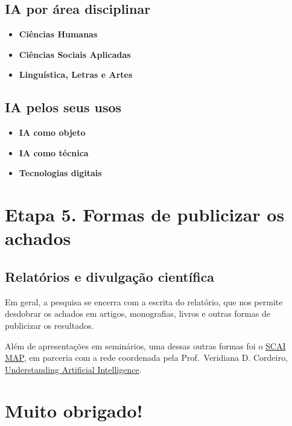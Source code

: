 \documentclass[
  brazilian,
  letterpaper,
  DIV=11,
  numbers=noendperiod]{scrartcl}
\providecommand{\tightlist}{%
  \setlength{\itemsep}{0pt}\setlength{\parskip}{0pt}}
\begin{document}
\subsection{IA por área disciplinar}\label{ia-por-uxe1rea-disciplinar-1}

\begin{itemize}
\tightlist
\item
  \textbf{Ciências Humanas}
\item
  \textbf{Ciências Sociais Aplicadas}
\item
  \textbf{Linguística, Letras e Artes}
\end{itemize}

\subsection{IA pelos seus usos}\label{ia-pelos-seus-usos}

\begin{itemize}
\tightlist
\item
  \textbf{IA como objeto}
\item
  \textbf{IA como técnica}
\item
  \textbf{Tecnologias digitais}
\end{itemize}

\section{Etapa 5. Formas de publicizar os
achados}\label{etapa-5.-formas-de-publicizar-os-achados}

\subsection{Relatórios e divulgação
científica}\label{relatuxf3rios-e-divulgauxe7uxe3o-cientuxedfica}

Em geral, a pesquisa se encerra com a escrita do relatório, que nos
permite desdobrar os achados em artigos, monografias, livros e outras
formas de publicizar os resultados.

Além de apresentações em seminários, uma dessas outras formas foi o
\href{https://scaimap.org/}{SCAI MAP}, em parceria com a rede coordenada
pela Prof.~Veridiana D. Cordeiro,
\href{https://understandingai.iea.usp.br/}{Understanding Artificial
Intelligence}.

\section{Muito obrigado!}\label{muito-obrigado}
\end{document}
